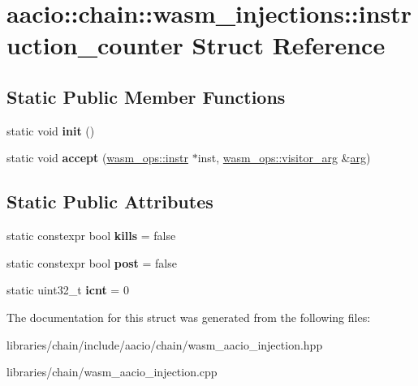 \hypertarget{structaacio_1_1chain_1_1wasm__injections_1_1instruction__counter}{}\section{aacio\+:\+:chain\+:\+:wasm\+\_\+injections\+:\+:instruction\+\_\+counter Struct Reference}
\label{structaacio_1_1chain_1_1wasm__injections_1_1instruction__counter}
\subsection*{Static Public Member Functions}
\begin{DoxyCompactItemize}
\item 
\mbox{\label{structaacio_1_1chain_1_1wasm__injections_1_1instruction__counter_a58822ba40df7171416224cfb1cca18ee}} 
static void {\bfseries init} ()
\item 
\mbox{\label{structaacio_1_1chain_1_1wasm__injections_1_1instruction__counter_a4aaecd9e7ad987af9ff2f1c6f2a4ed49}} 
static void {\bfseries accept} (\mbox{\hyperlink{structaacio_1_1chain_1_1wasm__ops_1_1instr}{wasm\+\_\+ops\+::instr}} $\ast$inst, \mbox{\hyperlink{structaacio_1_1chain_1_1wasm__ops_1_1visitor__arg}{wasm\+\_\+ops\+::visitor\+\_\+arg}} \&\mbox{\hyperlink{unionarg}{arg}})
\end{DoxyCompactItemize}
\subsection*{Static Public Attributes}
\begin{DoxyCompactItemize}
\item 
\mbox{\label{structaacio_1_1chain_1_1wasm__injections_1_1instruction__counter_a57e618576152bc9ffde70780078fa3e6}} 
static constexpr bool {\bfseries kills} = false
\item 
\mbox{\label{structaacio_1_1chain_1_1wasm__injections_1_1instruction__counter_a465106c1a37c70073878d8a45a19c987}} 
static constexpr bool {\bfseries post} = false
\item 
\mbox{\label{structaacio_1_1chain_1_1wasm__injections_1_1instruction__counter_a3c8ef2c777d37816525a672a2e50def4}} 
static uint32\+\_\+t {\bfseries icnt} = 0
\end{DoxyCompactItemize}


The documentation for this struct was generated from the following files\+:\begin{DoxyCompactItemize}
\item 
libraries/chain/include/aacio/chain/wasm\+\_\+aacio\+\_\+injection.\+hpp\item 
libraries/chain/wasm\+\_\+aacio\+\_\+injection.\+cpp\end{DoxyCompactItemize}
